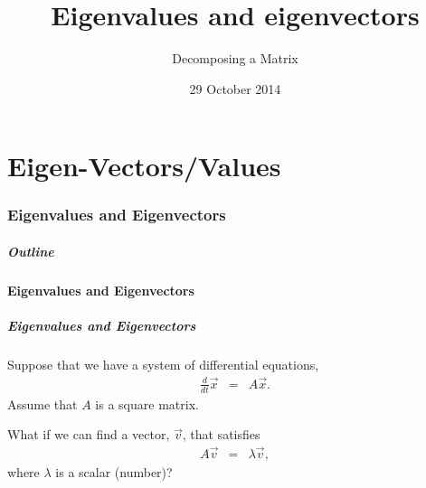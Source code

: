 \part{Eigen-Vectors/Values}
\section{Eigenvalues and Eigenvectors}


\title{Eigenvalues and eigenvectors}
\subtitle{Decomposing a Matrix}
\date{29 October 2014}

\begin{frame}
  \titlepage
\end{frame}

\begin{frame}
  \frametitle{Outline}
  \tableofcontents[currentsection]
\end{frame}


\subsection{Eigenvalues and Eigenvectors}


\begin{frame}
  \frametitle{Eigenvalues and Eigenvectors}

  Suppose that we have a system of differential equations,
  \begin{eqnarray*}
    \frac{d}{dt} \vec{x} & = & A \vec{x}.
  \end{eqnarray*}
  Assume that $A$ is a square matrix.

  What if we can find a vector, $\vec{v}$, that satisfies
  \begin{eqnarray*}
    A \vec{v} & = & \lambda \vec{v},
  \end{eqnarray*}
  where $\lambda$ is a scalar (number)?

\end{frame}


